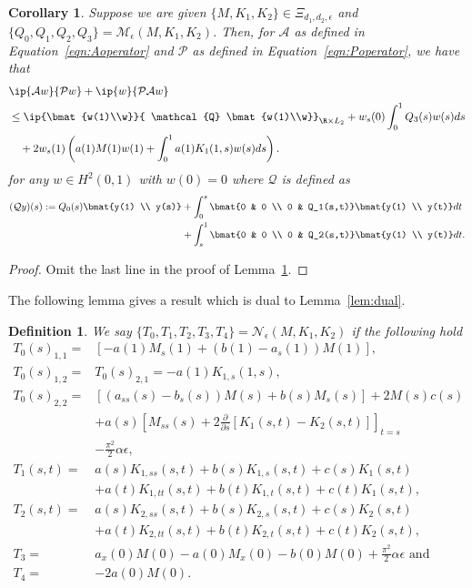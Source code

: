 \documentclass[9pt,journal,twocolumn]{IEEEtran}
\newtheorem{definition}{Definition}
\newtheorem{corollary}{Corollary}
\newcommand{\pfs}{\frac{\partial}{\partial s}}
\newcommand{\igzo}{\int_0^1}
\newcommand{\igzs}{\int_0^s}
\newcommand{\igso}{\int_s^1}
\begin{document}
\begin{corollary}\label{cor:primal2}
Suppose we are given  $\{M,K_1,K_2\} \in \Xi_{d_1,d_2,\epsilon}$ and $\{Q_0,Q_1,Q_2,Q_3\}=\mathcal{M}_\epsilon(M,K_1,K_2)$. Then, for $\mathcal{A}$ as defined in Equation~\eqref{eqn:Aoperator} and $\mathcal{P}$ as defined in Equation~\eqref{eqn:Poperator}, we have that
 \begin{align}
 &\ip{\mathcal{A}w}{\mathcal{P}w}+\ip{w}{\mathcal{P}\mathcal{A}w} \nonumber \\
 &\leq    \ip{\bmat{w(1)\\w}}{ \mathcal{Q} \bmat{w(1)\\w}}_{\R \times L_2} +w_s(0) \igzo Q_3(s)w(s)ds \nonumber \\
 &\quad +2 w_s(1) \left( a(1)M(1)w(1)+ \igzo  a(1)K_1(1,s)w(s)ds \right) .
 \end{align}
for any $w \in H^2(0,1)$ with $w(0)=0$ where $\mathcal{Q}$ is defined as
\begin{align*}
(\mathcal{Q}y)(s) := Q_0(s)\bmat{y(1) \\ y(s)} &+   \igzs  \bmat{0 & 0 \\ 0 & Q_1(s,t)} \bmat{y(1) \\ y(t)} dt \\
&+ \igso  \bmat{0 & 0 \\ 0 & Q_2(s,t)} \bmat{y(1) \\ y(t)} dt.
\end{align*}
\end{corollary}
\begin{proof}
Omit the last line in the proof of Lemma~\ref{cor:primal2}.
\end{proof}

The following lemma gives a result which is dual to Lemma~\ref{lem:dual}.

\begin{definition}
We say $\{T_0,T_1,T_2,T_3,T_4\}=\mathcal{N}_\epsilon(M,K_1,K_2)$ if the following hold
\begin{align}
T_0(s)_{1,1}=& \left[-a(1)M_s(1)+(b(1)-a_s(1))M(1) \right], \\
T_0(s)_{1,2}=&T_0(s)_{2,1}=-a(1)K_{1,s}(1,s), \\
T_0(s)_{2,2}=& \left[(a_{ss}(s)-b_s(s))M(s)+b(s)M_s(s)\right]+2 M(s)c(s) \nonumber \\
 & +a(s)\left[M_{ss}(s)+2\pfs \left[K_1(s,t)-K_2(s,t) \right] \right]_{t=s} \nonumber \\
 & -\frac{\pi^2}{2}\alpha \epsilon ,\\
T_1(s,t)=& a(s)K_{1,ss}(s,t)+b(s)K_{1,s}(s,t)+c(s)K_1(s,t) \nonumber \\
&+a(t)K_{1,tt}(s,t)+b(t)K_{1,t}(s,t)+c(t)K_1(s,t), \\
T_2(s,t)=& a(s)K_{2,ss}(s,t)+b(s)K_{2,s}(s,t)+c(s)K_2(s,t) \nonumber \\
&+a(t)K_{2,tt}(s,t)+b(t)K_{2,t}(s,t)+c(t)K_2(s,t),\\
T_3=&a_x(0)M(0)-a(0)M_x(0)-b(0)M(0)+\frac{\pi^2}{2}\alpha \epsilon \text{ and }\\
T_4=&-2 a(0)M(0).
\end{align}
\end{definition}
\end{document}
